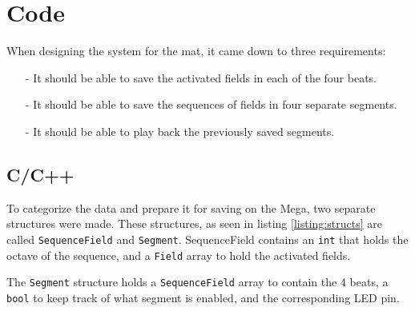 \section{Code}
	When designing the system for the mat, it came down to three requirements:
	\begin{itemize}
		\item[-] It should be able to save the activated fields in each of the four beats.
		\item[-] It should be able to save the sequences of fields in four separate segments.
		\item[-] It should be able to play back the previously saved segments.
	\end{itemize}
	\subsection{C/C++}%
		To categorize the data and prepare it for saving on the Mega, two separate structures were made. These structures, as seen in listing \autoref{listing:structs} are called \texttt{SequenceField} and \texttt{Segment}. SequenceField contains an \texttt{int} that holds the octave of the sequence, and a \texttt{Field} array to hold the activated fields.
		
	
		The \texttt{Segment} structure holds a \texttt{SequenceField} array to contain the 4 beats, a \texttt{bool} to keep track of what segment is enabled, and the corresponding LED pin.
		
